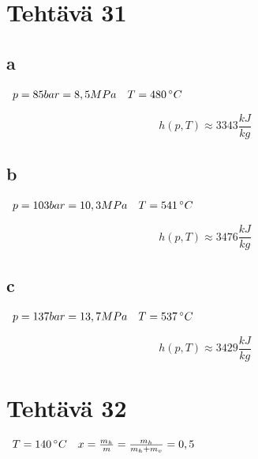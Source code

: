 \documentclass[12pt,a4paper,finnish]{article}
\begin{document}
\section{Tehtävä 31}

\subsection{a}
\begin{math}
 \begin{array}{l l}
  p = 85 bar = 8,5 MPa & T = 480\,^{\circ}C\\
 \end{array}
\end{math}

\begin{equation}
 h(p, T) \approx 3343 \frac{kJ}{kg}
\end{equation}

\subsection{b}
\begin{math}
 \begin{array}{l l}
  p = 103 bar = 10,3 MPa & T = 541\,^{\circ}C\\
 \end{array}
\end{math}

\begin{equation}
 h(p, T) \approx 3476 \frac{kJ}{kg}
\end{equation}

\subsection{c}
\begin{math}
 \begin{array}{l l}
  p = 137 bar = 13,7 MPa & T = 537\,^{\circ}C\\
 \end{array}
\end{math}

\begin{equation}
 h(p, T) \approx 3429 \frac{kJ}{kg}
\end{equation}

\section{Tehtävä 32}

\begin{math}
 \begin{array}{l l}
  T = 140\,^{\circ}C & x = \frac{m_h}{m} = \frac{m_h}{m_h + m_v} = 0,5\\
 \end{array}
\end{math}
\end{document}

